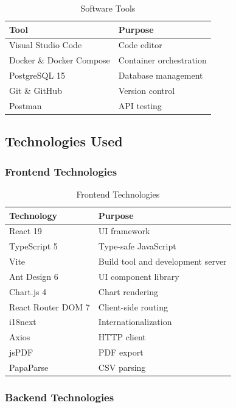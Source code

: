 \documentclass[12pt,a4paper]{report}
\begin{document}
\begin{table}[H]
\centering
\begin{tabular}{|l|l|}
\hline
\textbf{Tool} & \textbf{Purpose} \\
\hline
Visual Studio Code & Code editor \\
Docker \& Docker Compose & Container orchestration \\
PostgreSQL 15 & Database management \\
Git \& GitHub & Version control \\
Postman & API testing \\
\hline
\end{tabular}
\caption{Software Tools}
\end{table}

\subsection{Technologies Used}

\subsubsection{Frontend Technologies}

\begin{table}[H]
\centering
\begin{tabular}{|l|l|}
\hline
\textbf{Technology} & \textbf{Purpose} \\
\hline
React 19 & UI framework \\
TypeScript 5 & Type-safe JavaScript \\
Vite & Build tool and development server \\
Ant Design 6 & UI component library \\
Chart.js 4 & Chart rendering \\
React Router DOM 7 & Client-side routing \\
i18next & Internationalization \\
Axios & HTTP client \\
jsPDF & PDF export \\
PapaParse & CSV parsing \\
\hline
\end{tabular}
\caption{Frontend Technologies}
\end{table}

\subsubsection{Backend Technologies}
\end{document}
